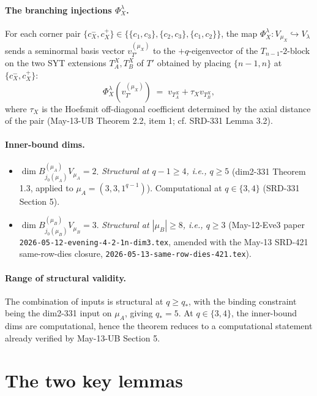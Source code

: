 \documentclass[11pt]{article}
\theoremstyle{definition}
\begin{document}
\paragraph{The branching injections $\Phi_X^\lambda$.}
For each corner pair $\{c_X^-, c_X^+\} \in \{\{c_1, c_3\},
\{c_2, c_3\}, \{c_1, c_2\}\}$, the map $\Phi_X^\lambda :
V_{\mu_X} \hookrightarrow V_\lambda$ sends a seminormal basis
vector $v_{T'}^{(\mu_X)}$ to the $+q$-eigenvector of the
$T_{n-1}$-$2$-block on the two SYT extensions $T_A^X, T_B^X$ of $T'$
obtained by placing $\{n-1, n\}$ at $\{c_X^-, c_X^+\}$:
\[
   \Phi_X^\lambda(v_{T'}^{(\mu_X)})
   \;=\;
   v_{T_A^X} + \tau_X v_{T_B^X},
\]
where $\tau_X$ is the Hoefsmit off-diagonal coefficient determined by
the axial distance of the pair (May-13-UB Theorem 2.2, item 1; cf.
SRD-331 Lemma 3.2).

\paragraph{Inner-bound dims.}
\begin{itemize}[leftmargin=2em,topsep=0.2em,itemsep=0.2em]
\item $\dim B^{(\mu_A)}_{j_0(\mu_A)} V_{\mu_A} = 2$.
\emph{Structural at $q - 1 \ge 4$, i.e., $q \ge 5$} (dim2-331
Theorem 1.3, applied to $\mu_A = (3, 3, 1^{q-1})$).
Computational at $q \in \{3, 4\}$ (SRD-331 Section 5).
\item $\dim B^{(\mu_B)}_{j_0(\mu_B)} V_{\mu_B} = 3$.
\emph{Structural at $|\mu_B| \ge 8$, i.e., $q \ge 3$}
(May-12-Eve3 paper \texttt{2026-05-12-evening-4-2-1n-dim3.tex},
amended with the May-13 SRD-421 same-row-dies closure,
\texttt{2026-05-13-same-row-dies-421.tex}).
\end{itemize}

\paragraph{Range of structural validity.}
The combination of inputs is structural at $q \ge q_*$, with the
binding constraint being the dim2-331 input on $\mu_A$, giving
$q_* = 5$. At $q \in \{3, 4\}$, the inner-bound dims are
computational, hence the theorem reduces to a computational statement
already verified by May-13-UB Section 5.

\section{The two key lemmas}\label{sec:lemmas}
\end{document}
